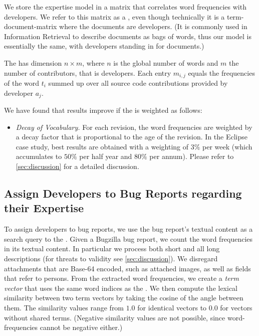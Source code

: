 We store the expertise model in a matrix that correlates word frequencies with developers. We refer to this matrix as a \TAM, even though technically it is a term-document-matrix where the documents are developers. (It is commonly used in Information Retrieval to describe documents as bags of words, thus our model is essentially the same, with developers standing in for documents.)

The \TAM has dimension $n \times m$, where $n$ is the global number of words and $m$ the number of contributors, that is developers. Each entry $m_{i,j}$ equals the frequencies of the word $t_i$ summed up over all source code contributions provided by developer $a_j$.

We have found that results improve if the \TAM is weighted as follows:

\begin{itemize}
\item \emph{Decay of Vocabulary.} For each revision, the word frequencies are weighted by a decay factor that is proportional to the age of the revision. In the Eclipse case study, best results are obtained with a weighting of $3\%$ per week (which accumulates to $50\%$ per half year and $80\%$ per annum). Please refer to \autoref{sec:discussion} for a detailed discussion.
\end{itemize}

\subsection{Assign Developers to Bug Reports regarding their Expertise}

To assign developers to bug reports, we use the bug report's textual content as a search query to the \TAM.
Given a Bugzilla bug report, we count the word frequencies in its textual content. In particular we process both short and all long descriptions (for threats to validity see \autoref{sec:discussion}).
We disregard attachments that are Base-64 encoded, such as attached images, as well as fields that refer to persons. From the extracted word frequencies, we create a \emph{term vector} that uses the same word indices as the \TAM. %
We then compute the lexical similarity between two term vectors by taking the cosine of the angle between them.
The similarity values range from $1.0$ for identical vectors to $0.0$ for vectors without shared terms. (Negative similarity values are not possible, since word-frequencies cannot be negative either.)

